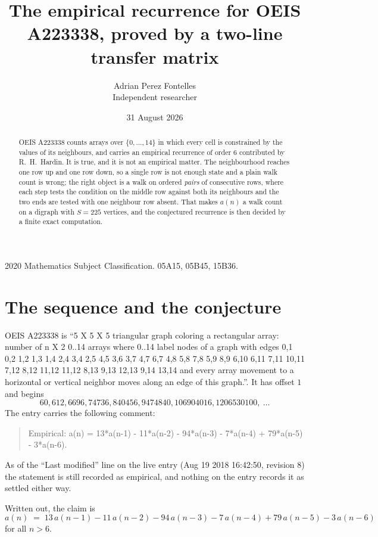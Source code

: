 \documentclass[11pt,a4paper]{article}
\title{The empirical recurrence for OEIS A223338, proved by a two-line transfer matrix}
\author{Adrian Perez Fontelles\\ \small Independent researcher}
\date{31 August 2026}
\theoremstyle{plain}
\theoremstyle{definition}
\begin{document}
\maketitle

\begin{abstract}
OEIS A223338 counts arrays over $\{0,\dots,14\}$ in which every cell is constrained by the
values of its neighbours, and carries an empirical recurrence of order $6$ contributed
by R.~H.~Hardin. It is true, and it is not an empirical matter. The neighbourhood reaches one
row up and one row down, so a single row is not enough state and a plain walk count
is wrong; the right object is a walk on ordered \emph{pairs} of consecutive rows, where
each step tests the condition on the middle row against both its neighbours and the two
ends are tested with one neighbour row absent. That makes $a(n)$ a walk count on a digraph
with $S=225$ vertices, and the conjectured recurrence is then decided by a finite exact
computation.
\end{abstract}

\noindent\small 2020 Mathematics Subject Classification. 05A15, 05B45, 15B36.\normalsize

\section{The sequence and the conjecture}

OEIS A223338 is ``5 X 5 X 5 triangular graph coloring a rectangular array: number of n X 2 0..14 arrays where 0..14 label nodes of a graph with edges 0,1 0,2 1,2 1,3 1,4 2,4 3,4 2,5 4,5 3,6 3,7 4,7 6,7 4,8 5,8 7,8 5,9 8,9 6,10 6,11 7,11 10,11 7,12 8,12 11,12 11,12 8,13 9,13 12,13 9,14 13,14 and every array movement to a horizontal or vertical neighbor moves along an edge of this graph.''. It has offset $1$ and begins
\[
60, 612, 6696, 74736, 840456, 9474840, 106904016, 1206530100,\ \dots
\]
The entry carries the following comment:
\begin{quote}\small
Empirical: a(n) = 13*a(n-1) - 11*a(n-2) - 94*a(n-3) - 7*a(n-4) + 79*a(n-5) - 3*a(n-6).
\end{quote}
As of the ``Last modified'' line on the live entry (Aug 19 2018 16:42:50, revision 8) the statement is
still recorded as empirical, and nothing on the entry records it as settled either way.

Written out, the claim is
\begin{equation}\label{eq:conj}
a(n)\;=\;13\,a(n-1) - 11\,a(n-2) - 94\,a(n-3) - 7\,a(n-4) + 79\,a(n-5) - 3\,a(n-6)
\end{equation}
for all $n>6$.
\end{document}
